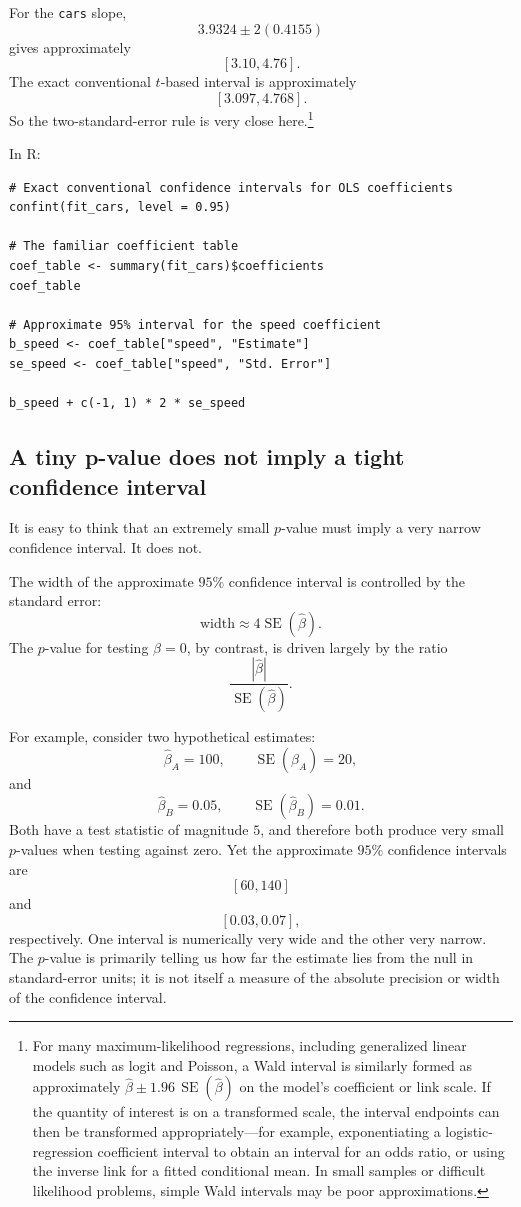 \documentclass[11pt]{report}
\begin{document}
For the \texttt{cars} slope,
\[
3.9324 \pm 2(0.4155)
\]
gives approximately
\[
[3.10,4.76].
\]
The exact conventional \(t\)-based interval is approximately
\[
[3.097,4.768].
\]
So the two-standard-error rule is very close here.\footnote{For many maximum-likelihood regressions, including generalized linear models such as logit and Poisson, a Wald interval is similarly formed as approximately \(\widehat{\beta}\pm1.96\,\operatorname{SE}(\widehat{\beta})\) on the model's coefficient or link scale. If the quantity of interest is on a transformed scale, the interval endpoints can then be transformed appropriately---for example, exponentiating a logistic-regression coefficient interval to obtain an interval for an odds ratio, or using the inverse link for a fitted conditional mean. In small samples or difficult likelihood problems, simple Wald intervals may be poor approximations.}

In R:

\begin{lstlisting}
# Exact conventional confidence intervals for OLS coefficients
confint(fit_cars, level = 0.95)

# The familiar coefficient table
coef_table <- summary(fit_cars)$coefficients
coef_table

# Approximate 95% interval for the speed coefficient
b_speed <- coef_table["speed", "Estimate"]
se_speed <- coef_table["speed", "Std. Error"]

b_speed + c(-1, 1) * 2 * se_speed
\end{lstlisting}

\subsection{A tiny p-value does not imply a tight confidence interval}

It is easy to think that an extremely small \(p\)-value must imply a very narrow confidence interval. It does not.

The width of the approximate \(95\%\) confidence interval is controlled by the standard error:
\[
\text{width}\approx 4\operatorname{SE}(\widehat{\beta}).
\]
The \(p\)-value for testing \(\beta=0\), by contrast, is driven largely by the ratio
\[
\frac{|\widehat{\beta}|}{\operatorname{SE}(\widehat{\beta})}.
\]

For example, consider two hypothetical estimates:
\[
\widehat{\beta}_A=100,
\qquad
\operatorname{SE}(\widehat{\beta}_A)=20,
\]
and
\[
\widehat{\beta}_B=0.05,
\qquad
\operatorname{SE}(\widehat{\beta}_B)=0.01.
\]
Both have a test statistic of magnitude \(5\), and therefore both produce very small \(p\)-values when testing against zero. Yet the approximate \(95\%\) confidence intervals are
\[
[60,140]
\]
and
\[
[0.03,0.07],
\]
respectively. One interval is numerically very wide and the other very narrow. The \(p\)-value is primarily telling us how far the estimate lies from the null in standard-error units; it is not itself a measure of the absolute precision or width of the confidence interval.
\end{document}
